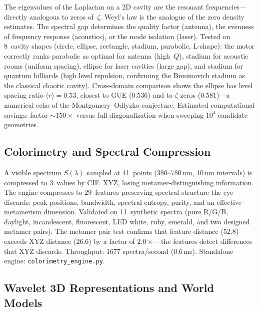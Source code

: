 \documentclass[11pt]{amsart}
\begin{document}
The eigenvalues of the Laplacian on a 2D cavity are the resonant
frequencies---directly analogous to zeros of~$\zeta$. Weyl's law is the
analogue of the zero density estimates. The spectral gap determines the
quality factor (antenna), the evenness of frequency response (acoustics), or
the mode isolation (laser). Tested on 8~cavity shapes (circle, ellipse,
rectangle, stadium, parabolic, L-shape): the motor correctly ranks parabolic
as optimal for antenna (high~$Q$), stadium for acoustic rooms (uniform
spacing), ellipse for laser cavities (large gap), and stadium for quantum
billiards (high level repulsion, confirming the Bunimovich stadium as the
classical chaotic cavity). Cross-domain comparison shows the ellipse has
level spacing ratio $\langle r\rangle = 0.53$, closest to GUE ($0.536$) and
to $\zeta$ zeros ($0.581$)---a numerical echo of the Montgomery--Odlyzko
conjecture. Estimated computational savings: factor ${\sim}150\times$ versus
full diagonalization when sweeping $10^4$ candidate geometries.

\subsection{Colorimetry and Spectral Compression}

A visible spectrum $S(\lambda)$ sampled at 41~points (380--780\,nm, 10\,nm
intervals) is compressed to 3~values by CIE~XYZ, losing
metamer-distinguishing information. The engine compresses to 29~features
preserving spectral structure the eye discards: peak positions, bandwidth,
spectral entropy, purity, and an effective metamerism dimension. Validated on
11~synthetic spectra (pure R/G/B, daylight, incandescent, fluorescent, LED
white, ruby, emerald, and two designed metamer pairs). The metamer pair test
confirms that feature distance ($52.8$) exceeds XYZ distance ($26.6$) by a
factor of $2.0\times$---the features detect differences that XYZ discards.
Throughput: 1677 spectra/second ($0.6\,$ms). Standalone engine:
\texttt{colorimetry\_engine.py}.

\subsection{Wavelet 3D Representations and World Models}
\end{document}
